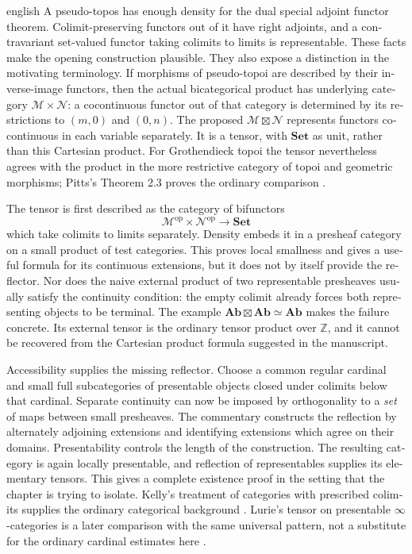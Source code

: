 \begin{otherlanguage}{english}
\begin{otherlanguage*}{english}
A pseudo-topos has enough density for the dual special adjoint functor theorem. Colimit-preserving functors out of it have right adjoints, and a contravariant set-valued functor taking colimits to limits is representable. These facts make the opening construction plausible. They also expose a distinction in the motivating terminology. If morphisms of pseudo-topoi are described by their inverse-image functors, then the actual bicategorical product has underlying category $\mathcal M\times\mathcal N$: a cocontinuous functor out of that category is determined by its restrictions to $(m,0)$ and $(0,n)$. The proposed $\mathcal M\boxtimes\mathcal N$ represents functors cocontinuous in each variable separately. It is a tensor, with $\mathbf{Set}$ as unit, rather than this Cartesian product. For Grothendieck topoi the tensor nevertheless agrees with the product in the more restrictive category of topoi and geometric morphisms; Pitts's Theorem 2.3 proves the ordinary comparison \citep{Pitts1985}.

The tensor is first described as the category of bifunctors
\[
 \mathcal M^{\mathrm{op}}\times\mathcal N^{\mathrm{op}}
 \longrightarrow\mathbf{Set}
\]
which take colimits to limits separately. Density embeds it in a presheaf category on a small product of test categories. This proves local smallness and gives a useful formula for its continuous extensions, but it does not by itself provide the reflector. Nor does the naive external product of two representable presheaves usually satisfy the continuity condition: the empty colimit already forces both representing objects to be terminal. The example $\mathbf{Ab}\boxtimes\mathbf{Ab}\simeq\mathbf{Ab}$ makes the failure concrete. Its external tensor is the ordinary tensor product over $\mathbb Z$, and it cannot be recovered from the Cartesian product formula suggested in the manuscript.

Accessibility supplies the missing reflector. Choose a common regular cardinal and small full subcategories of presentable objects closed under colimits below that cardinal. Separate continuity can now be imposed by orthogonality to a \emph{set} of maps between small presheaves. The commentary constructs the reflection by alternately adjoining extensions and identifying extensions which agree on their domains. Presentability controls the length of the construction. The resulting category is again locally presentable, and reflection of representables supplies its elementary tensors. This gives a complete existence proof in the setting that the chapter is trying to isolate. Kelly's treatment of categories with prescribed colimits supplies the ordinary categorical background \citep[Section 6.5]{Kelly1982}. Lurie's tensor on presentable $\infty$-categories is a later comparison with the same universal pattern, not a substitute for the ordinary cardinal estimates here \citep[Section 4.8.1]{Lurie2017HA}.


\end{otherlanguage*}
\end{otherlanguage}
